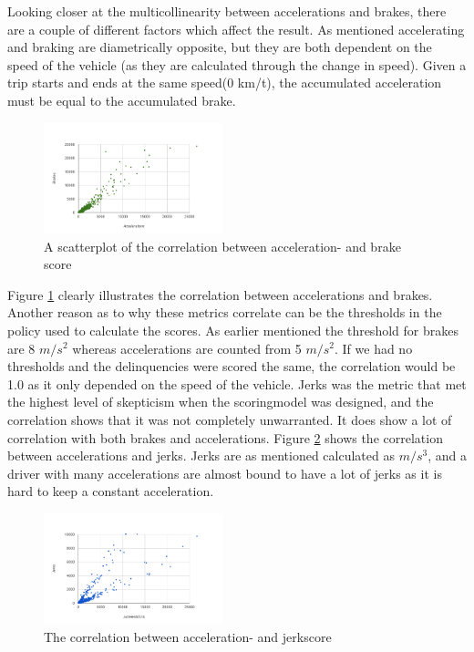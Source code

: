 Looking closer at the multicollinearity between accelerations and brakes, there are a couple of different factors which affect the result. As mentioned accelerating and braking are diametrically opposite, but they are both dependent on the speed of the vehicle (as they are calculated through the change in speed). Given a trip starts and ends at the same speed(0 km/t), the accumulated acceleration must be equal to the accumulated brake.

\begin{figure}[tb]
\centering
\includegraphics[width=0.465\textwidth]{Pictures/abcorrel}
\caption{A scatterplot of the correlation between acceleration- and brake score}
\label{fig:abcorrel}
\end{figure}

Figure \ref{fig:abcorrel} clearly illustrates the correlation between accelerations and brakes. Another reason as to why these metrics correlate can be the thresholds in the policy used to calculate the scores. As earlier mentioned the threshold for brakes are 8 $m/s^2$ whereas accelerations are counted from 5 $m/s^2$. If we had no thresholds and the delinquencies were scored the same, the correlation would be 1.0 as it only depended on the speed of the vehicle. 
Jerks was the metric that met the highest level of skepticism when the scoringmodel was designed, and the correlation shows that it was not completely unwarranted. It does show a lot of correlation with both brakes and accelerations. Figure \ref{fig:ajcorrel} shows the correlation between accelerations and jerks. Jerks are as mentioned calculated as $m/s^3$, and a driver with many accelerations are almost bound to have a lot of jerks as it is hard to keep a constant acceleration.

\begin{figure}[tb]
\centering
\includegraphics[width=0.465\textwidth]{Pictures/ajcorrel}
\caption{The correlation between acceleration- and jerkscore}
\label{fig:ajcorrel}
\end{figure}